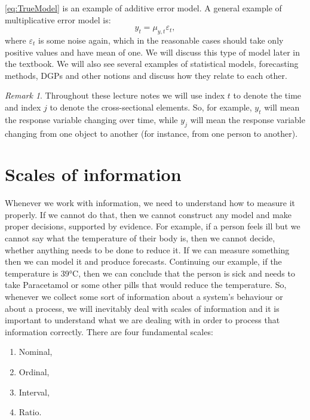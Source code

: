 \documentclass[
]{book}
\providecommand{\tightlist}{%
  \setlength{\itemsep}{0pt}\setlength{\parskip}{0pt}}
\theoremstyle{definition}
\theoremstyle{definition}
\theoremstyle{definition}
\theoremstyle{definition}
\theoremstyle{remark}
\newtheorem*{remark}{Remark}
\begin{document}
\eqref{eq:TrueModel} is an example of additive error model. A general example of multiplicative error model is:
\begin{equation}
    y_t = \mu_{y,t} \varepsilon_t,
    \label{eq:TrueModelMultiplicative}
\end{equation}
where \(\varepsilon_t\) is some noise again, which in the reasonable cases should take only positive values and have mean of one. We will discuss this type of model later in the textbook. We will also see several examples of statistical models, forecasting methods, DGPs and other notions and discuss how they relate to each other.

\begin{remark}
Throughout these lecture notes we will use index \(t\) to denote the time and index \(j\) to denote the cross-sectional elements. So, for example, \(y_t\) will mean the response variable changing over time, while \(y_j\) will mean the response variable changing from one object to another (for instance, from one person to another).
\end{remark}

\hypertarget{scales}{%
\section{Scales of information}\label{scales}}

Whenever we work with information, we need to understand how to measure it properly. If we cannot do that, then we cannot construct any model and make proper decisions, supported by evidence. For example, if a person feels ill but we cannot say what the temperature of their body is, then we cannot decide, whether anything needs to be done to reduce it. If we can measure something then we can model it and produce forecasts. Continuing our example, if the temperature is 39°C, then we can conclude that the person is sick and needs to take Paracetamol or some other pills that would reduce the temperature. So, whenever we collect some sort of information about a system's behaviour or about a process, we will inevitably deal with scales of information and it is important to understand what we are dealing with in order to process that information correctly. There are four fundamental scales:

\begin{enumerate}
\def\labelenumi{\arabic{enumi}.}
\tightlist
\item
  Nominal,
\item
  Ordinal,
\item
  Interval,
\item
  Ratio.
\end{enumerate}
\end{document}
